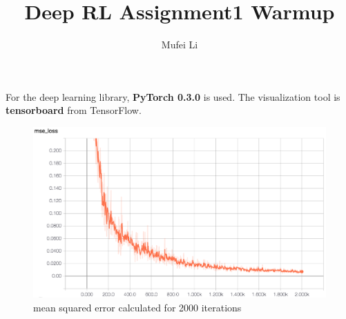 \documentclass{article}
\title{Deep RL Assignment1 Warmup}
\author{Mufei Li}
\begin{document}
\maketitle

For the deep learning library, \textbf{PyTorch 0.3.0} is used. The visualization tool is \textbf{tensorboard} from TensorFlow.

\begin{figure}[H]
\includegraphics[width=\textwidth]{learning_curve.png}
\caption{mean squared error calculated for 2000 iterations}
\end{figure}
\end{document}
